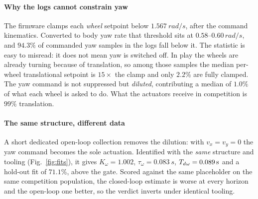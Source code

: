\paragraph{Why the logs cannot constrain yaw}
The firmware clamps each \emph{wheel} setpoint below $\SI{1.567}{rad/s}$, after
the command kinematics. Converted to body yaw rate that threshold sits at
$0.58$--$0.60\,\si{rad/s}$, and $94.3\%$ of commanded yaw samples in the logs
fall below it. The statistic is easy to misread: it does not mean yaw is
switched off. In play the wheels are already turning because of translation, so
among those samples the median per-wheel translational setpoint is $15\times$
the clamp and only $2.2\%$ are fully clamped. The yaw command is not suppressed
but \emph{diluted}, contributing a median of $1.0\%$ of what each wheel is asked
to do. What the actuators receive in competition is $99\%$ translation.

\paragraph{The same structure, different data}
A short dedicated open-loop collection removes the dilution: with
$v_x = v_y = 0$ the yaw command becomes the sole actuation. Identified with the
\emph{same} structure and tooling (Fig.~\ref{fig:fits}), it gives
$K_\omega = 1.002$, $\tau_\omega = \SI{0.083}{s}$, $T_{d}{}_\omega = \SI{0.089}{s}$
and a hold-out fit of $71.1\%$, above the gate. Scored against the same
placeholder on the same competition population, the closed-loop estimate is
worse at every horizon and the open-loop one better, so the verdict inverts
under identical tooling.